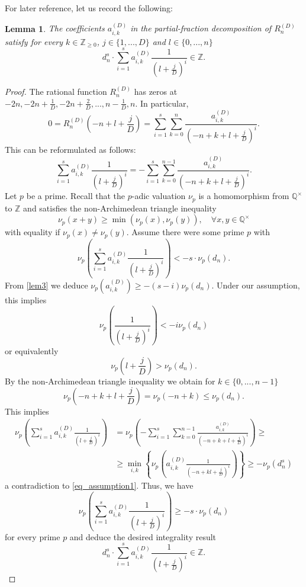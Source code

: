\documentclass[11pt]{amsart}
\theoremstyle{plain}
\newtheorem{lem}[thm]{Lemma}
\theoremstyle{remark}
\theoremstyle{definition}
\newcommand{\ZZ}{\mathbb{Z}}
\newcommand{\QQ}{\mathbb{Q}}
\begin{document}
For later reference, let us record the following:
\begin{lem}\label{lem4}
The coefficients $a^{(D)}_{i,k}$ in the partial-fraction decomposition of $R^{(D)}_n$ satisfy for every $k\in\ZZ_{\geq0}$, $j\in\{1,...,D\}$ and $l\in\{0,...,n\}$ 
\[
	d_n^s \cdot \sum_{i=1}^s a_{i,k}^{(D)}\frac{1}{(l+\frac{j}{D})^i}\in \ZZ.
\]
\end{lem}
\begin{proof}
The rational function $R_n^{(D)}$ has zeros at $-2n,-2n+\frac{1}{D},-2n+\frac{2}{D},...,n-\frac{1}{D},n$. In particular,
\[
	0=R_n^{(D)}(-n+l+\frac{j}{D})=\sum_{i=1}^s\sum_{k=0}^n\frac{a_{i,k}^{(D)}}{(-n+k+l+\frac{j}{D})^i}.
\]
This can be reformulated as follows:
\[
	\sum_{i=1}^s a_{i,k}^{(D)}\frac{1}{(l+\frac{j}{D})^i}=-\sum_{i=1}^s\sum_{k=0}^{n-1}\frac{a_{i,k}^{(D)}}{(-n+k+l+\frac{j}{D})^i}.
\]
Let $p$ be a prime. Recall that the $p$-adic valuation $\nu_p$ is a homomorphism from $\QQ^\times$ to $\ZZ$ and satisfies the non-Archimedean triangle inequality
\[
	\nu_p(x+y)\geq \min(\nu_p(x),\nu_p(y)), \quad \forall x,y\in\QQ^\times
\]
with equality if $\nu_p(x)\neq \nu_p(y)$. Assume there were some prime $p$ with
\begin{equation}\label{eq_assumption1}
	\nu_p\left( \sum_{i=1}^s a_{i,k}^{(D)}\frac{1}{(l+\frac{j}{D})^i}\right)<-s\cdot\nu_p(d_n).
\end{equation}
From \cref{lem3} we deduce $\nu_p(a_{i,k}^{(D)})\geq -(s-i)\nu_p(d_n)$. Under our assumption, this implies
\[
	\nu_p\left(\frac{1}{(l+\frac{j}{D})^i}\right)<-i\nu_p(d_n)
\]
or equivalently
\[
	\nu_p\left(l+\frac{j}{D}\right)>\nu_p(d_n).
\]
By the non-Archimedean triangle inequality we obtain for $k\in\{0,...,n-1\}$
\[
	\nu_p\left(-n+k+l+\frac{j}{D}\right)=\nu_p(-n+k)\leq \nu_p(d_n).
\]
This implies
\begin{align*}
	\nu_p\left( \sum_{i=1}^s a_{i,k}^{(D)}\frac{1}{(l+\frac{j}{D})^i}\right)&=\nu_p\left(-\sum_{i=1}^s\sum_{k=0}^{n-1}\frac{a_{i,k}^{(D)}}{(-n+k+l+\frac{j}{D})^i}\right)\geq\\
	&\geq  \min_{i,k}\left\{\nu_p\left(a_{i,k}^{(D)}\frac{1}{(-n+kl+\frac{j}{D})^i}\right)\right\}\geq -\nu_p(d_n^s)
\end{align*}
a contradiction to \eqref{eq_assumption1}. Thus, we have
\[
	\nu_p\left( \sum_{i=1}^s a_{i,k}^{(D)}\frac{1}{(l+\frac{j}{D})^i}\right)\geq -s\cdot\nu_p(d_n)
\]
for every prime $p$ and deduce the desired integrality result
\[
	d_n^s \cdot \sum_{i=1}^s a_{i,k}^{(D)}\frac{1}{(l+\frac{j}{D})^i}\in \ZZ.
\]
\end{proof}
\end{document}
